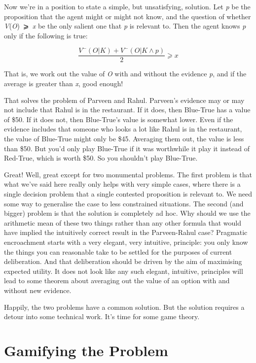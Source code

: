 \documentclass[
  11pt,
  letterpaper,
  DIV=11,
  numbers=noendperiod,
  twoside]{scrartcl}
\begin{document}
Now we're in a position to state a simple, but unsatisfying, solution.
Let \emph{p} be the proposition that the agent might or might not know,
and the question of whether \emph{V}(\emph{O})~⩾~\emph{x} be the only
salient one that \emph{p} is relevant to. Then the agent knows \emph{p}
only if the following is true:

\[
\frac{V^-(O | K) + V^-(O | K \wedge p)}{2} ⩾ x
\]

That is, we work out the value of \emph{O} with and without the evidence
\emph{p}, and if the average is greater than \emph{x}, good enough!

That solves the problem of Parveen and Rahul. Parveen's evidence may or
may not include that Rahul is in the restaurant. If it does, then
Blue-True has a value of \$50. If it does not, then Blue-True's value is
somewhat lower. Even if the evidence includes that someone who looks a
lot like Rahul is in the restaurant, the value of Blue-True might only
be \$45. Averaging them out, the value is less than \$50. But you'd only
play Blue-True if it was worthwhile it play it instead of Red-True,
which is worth \$50. So you shouldn't play Blue-True.

Great! Well, great except for two monumental problems. The first problem
is that what we've said here really only helps with very simple cases,
where there is a single decision problem that a single contested
proposition is relevant to. We need some way to generalise the case to
less constrained situations. The second (and bigger) problem is that the
solution is completely ad hoc. Why should we use the arithmetic mean of
these two things rather than any other formula that would have implied
the intuitively correct result in the Parveen-Rahul case? Pragmatic
encroachment starts with a very elegant, very intuitive, principle: you
only know the things you can reasonable take to be settled for the
purposes of current deliberation. And that deliberation should be driven
by the aim of maximising expected utility. It does not look like any
such elegant, intuitive, principles will lead to some theorem about
averaging out the value of an option with and without new evidence.

Happily, the two problems have a common solution. But the solution
requires a detour into some technical work. It's time for some game
theory.

\section{Gamifying the Problem}\label{gamifyingtheproblem}
\end{document}
